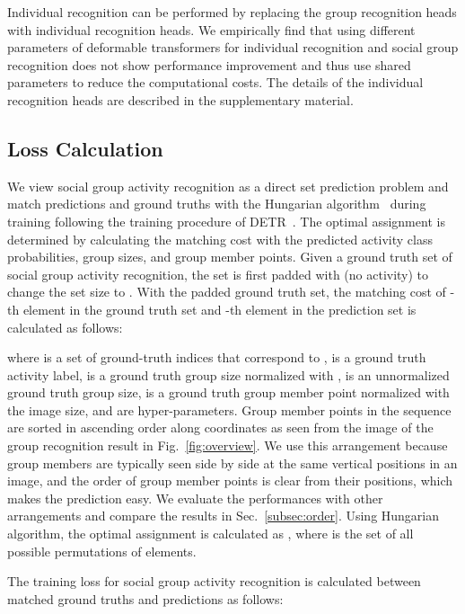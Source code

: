 \documentclass[runningheads]{llncs}
\begin{document}
Individual recognition can be performed by replacing the group recognition heads with individual recognition heads. We empirically find that using different parameters of deformable transformers for individual recognition and social group recognition does not show performance improvement and thus use shared parameters to reduce the computational costs. The details of the individual recognition heads are described in the supplementary material. 

\subsection{Loss Calculation}\label{subsec:loss_calc}

We view social group activity recognition as a direct set prediction problem and match predictions and ground truths with the Hungarian algorithm~\cite{kuhn_naval1955} during training following the training procedure of DETR~\cite{carion_eccv2020}.
The optimal assignment is determined by calculating the matching cost with the predicted activity class probabilities, group sizes, and group member points. Given a ground truth set of social group activity recognition, the set is first padded with  (no activity) to change the set size to . With the padded ground truth set, the matching cost of -th element in the ground truth set and -th element in the prediction set is calculated as follows:

where  is a set of ground-truth indices that correspond to ,  is a ground truth activity label,  is a ground truth group size normalized with ,  is an unnormalized ground truth group size,  is a ground truth group member point normalized with the image size, and  are hyper-parameters. Group member points in the sequence  are sorted in ascending order along  coordinates as seen from the image of the group recognition result in Fig.~\ref{fig:overview}. We use this arrangement because group members are typically seen side by side at the same vertical positions in an image, and the order of group member points is clear from their positions, which makes the prediction easy. We evaluate the performances with other arrangements and compare the results in Sec.~\ref{subsec:order}. Using Hungarian algorithm, the optimal assignment is calculated as , where  is the set of all possible permutations of  elements.

The training loss for social group activity recognition  is calculated between matched ground truths and predictions as follows:
\end{document}
